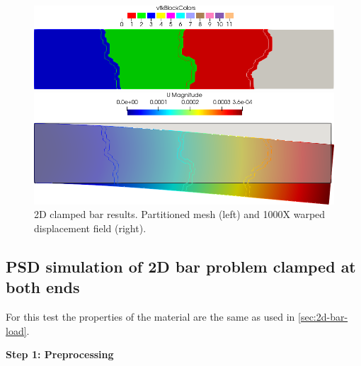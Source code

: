 \documentclass{report}
\begin{document}
\begin{figure}[htbp]
    \centering
    \begin{minipage}[t][2cm][t]{0.4\textwidth}
    \includegraphics[align=t,width=1\textwidth]{2d-bar-partioned.png}
    \end{minipage}\hspace{.1\textwidth}
    \begin{minipage}[t][2cm][t]{0.4\textwidth}
    \includegraphics[align=t,width=1\textwidth]{2d-bar-results.png}
    \end{minipage}
    \caption{2D clamped bar results. Partitioned mesh (left) and 1000X warped displacement field (right).}
    \label{fig:my_label}
\end{figure}


\subsection{PSD simulation of 2D bar problem clamped at both ends \label{sec:2D-bar-clamped1}}

For this test the properties of the material are the same as used in \cref{sec:2d-bar-load}. 

\textbf{Step 1: Preprocessing}
\end{document}
